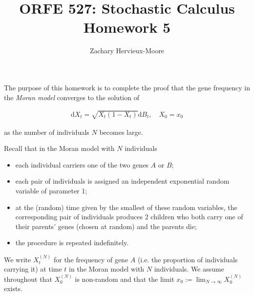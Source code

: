 \documentclass[12pt]{article}
\title{ORFE 527: Stochastic Calculus \\ Homework 5}
\author{Zachary Hervieux-Moore}
\date{\displaydate{date}}
\theoremstyle{colon}
\begin{document}
\maketitle

The purpose of this homework is to complete the proof that the gene frequency in the \textit{Moran model} converges to the solution of

\begin{gather*}
  \text{d} X_t = \sqrt{X_t (1 - X_t)} \text{d} B_t, \quad X_0 = x_0
\end{gather*}

as the number of individuals $N$ becomes large.

Recall that in the Moran model with $N$ individuals
\begin{itemize}
    \item each individual carriers one of the two genes $A$ or $B$;
    \item each pair of individuals is assigned an independent exponential random variable of parameter 1;
    \item at the (random) time given by the smallest of these random variables, the corresponding pair of individuals produces 2 children who both carry one of their parents' genes (chosen at random) and the parents die;
    \item the procedure is repeated indefinitely.
\end{itemize}

We write $X_t^{(N)}$ for the frequency of gene $A$ (i.e. the proportion of individuals carrying it) at time $t$ in the Moran model with $N$ individuals. We assume throughout that $X_0^{(N)}$ is non-random and that the limit $x_0 := \lim_{N \rightarrow \infty} X_0^{(N)}$ exists.

\clearpage
\end{document}
